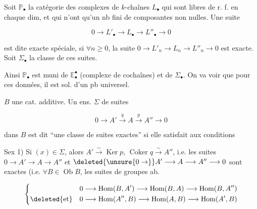 
Soit $\mathbb P_{\bullet}$ la catégorie des complexes de $k$-chaînes $L_{\bullet}$ qui sont libres de r. f. en chaque dim, et qui n'ont qu'un nb fini de composantes non nulles. Une suite


\[
 0\longrightarrow L'_{\bullet}\longrightarrow L_{\bullet}\longrightarrow L''_{\bullet}\longrightarrow 0
\]

 est dite exacte spéciale, si $\forall n\geq0$, la suite $0\to L'_n\longrightarrow L_n\longrightarrow L''_n\longrightarrow0$ est exacte. Soit $\Sigma_{\bullet}$ la classe de ces suites.

Ainsi $\mathbb P_{\bullet}$ est muni de $\mathbb E_{\bullet}^{\bullet}$ (complexe de cochaînes) et de $\Sigma_{\bullet}$. On va voir que pour ces données, il est sol. d'un pb universel.

\margin{!}

 $B$ une cat. additive. Un ens. $\Sigma$ de suites

\[
 0\longrightarrow A'\xrightarrow{q} A\xrightarrow{p}A''\longrightarrow0 \tag*{(x)}
\]

dans $B$ est dit ``une classe de suites exactes'' si elle satisfait aux conditions

Sex 1) Si $(x)\in\Sigma$, alors $A'\overset{\sim}{\longrightarrow}\operatorname{Ker}p$, $\operatorname{Coker}q\overset{\sim}{\longrightarrow}A''$, i.e. les suites $0\longrightarrow A'\longrightarrow A\longrightarrow A''$ et $\deleted{\unsure{0\to}}A'\longrightarrow A\longrightarrow A''\longrightarrow0$ sont exactes (i.e. $\forall B\in\operatorname{Ob}B$, les suites de groupes ab.

\[
 \left\{\begin{aligned}
 0&\longrightarrow\operatorname{Hom}(B,A')\longrightarrow\operatorname{Hom}(B,A)\longrightarrow\operatorname{Hom}(B,A'')\\
 \deleted{\text{et}}\quad0&\longrightarrow\operatorname{Hom}(A'',B)\longrightarrow\operatorname{Hom}(A,B)\longrightarrow\operatorname{Hom}(A',B)
 \end{aligned}\right.
\]

